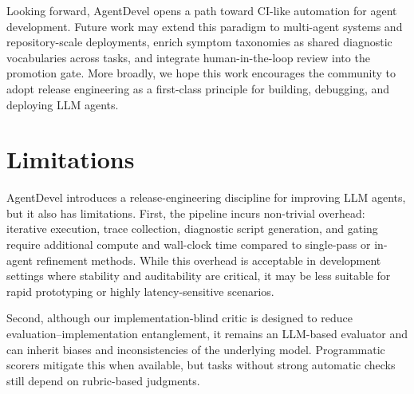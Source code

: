 \documentclass[11pt]{article}
\begin{document}
Looking forward, AgentDevel opens a path toward CI-like automation for agent development. Future work may extend this paradigm to multi-agent systems and repository-scale deployments, enrich symptom taxonomies as shared diagnostic vocabularies across tasks, and integrate human-in-the-loop review into the promotion gate. More broadly, we hope this work encourages the community to adopt release engineering as a first-class principle for building, debugging, and deploying LLM agents.




%


\appendix
\label{sec:appendix}
\section{Limitations}

AgentDevel introduces a release-engineering discipline for improving LLM agents, but it also has limitations. First, the pipeline incurs non-trivial overhead: iterative execution, trace collection, diagnostic script generation, and gating require additional compute and wall-clock time compared to single-pass or in-agent refinement methods. While this overhead is acceptable in development settings where stability and auditability are critical, it may be less suitable for rapid prototyping or highly latency-sensitive scenarios.

Second, although our implementation-blind critic is designed to reduce evaluation–implementation entanglement, it remains an LLM-based evaluator and can inherit biases and inconsistencies of the underlying model. Programmatic scorers mitigate this when available, but tasks without strong automatic checks still depend on rubric-based judgments.
\end{document}
